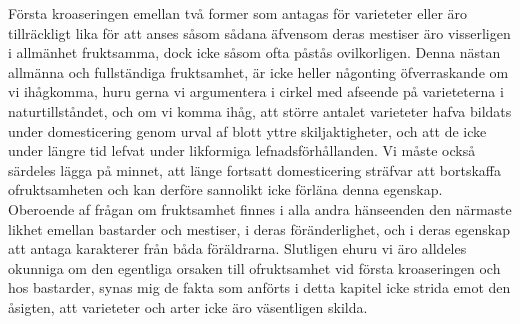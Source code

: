 Första kroaseringen emellan två former som antagas för varieteter eller äro tillräckligt lika för att anses såsom sådana äfvensom deras mestiser äro visserligen i allmänhet fruktsamma, dock icke såsom ofta påstås ovilkorligen. Denna nästan allmänna och fullständiga fruktsamhet, är icke heller någonting öfverraskande om vi ihågkomma, huru gerna vi argumentera i cirkel med afseende på varieteterna i naturtillståndet, och om vi komma ihåg, att större antalet varieteter hafva bildats under domesticering genom urval af blott yttre skiljaktigheter, och att de icke under längre tid lefvat under likformiga lefnadsförhållanden. Vi måste också särdeles lägga på minnet, att länge fortsatt domesticering sträfvar att bortskaffa ofruktsamheten och kan derföre sannolikt icke förläna denna egenskap. Oberoende af frågan om fruktsamhet finnes i alla andra hänseenden den närmaste likhet emellan bastarder och mestiser, i deras föränderlighet, och i deras egenskap att antaga karakterer från båda föräldrarna. Slutligen ehuru vi äro alldeles okunniga om den egentliga orsaken till ofruktsamhet vid första kroaseringen och hos bastarder, synas mig de fakta som anförts i detta kapitel icke strida emot den åsigten, att varieteter och arter icke äro väsentligen skilda.


